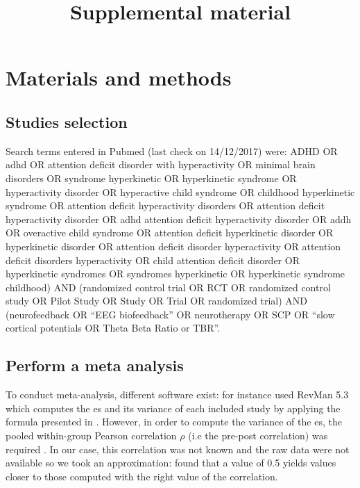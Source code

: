 \documentclass[12pt,a4paper,english]{article}
\begin{document}
\title{Supplemental material}
\date{}
\maketitle

\section{Materials and methods}

\subsection{Studies selection}
Search terms entered in Pubmed (last check on 14/12/2017) were: 
\guillemotleft ADHD OR adhd OR attention deficit disorder with hyperactivity OR minimal brain disorders OR syndrome hyperkinetic OR hyperkinetic
syndrome OR hyperactivity disorder OR hyperactive child syndrome OR childhood hyperkinetic syndrome OR attention deficit hyperactivity disorders
OR attention deficit hyperactivity disorder OR adhd attention deficit hyperactivity disorder OR addh OR overactive child syndrome OR attention deficit hyperkinetic 
disorder OR hyperkinetic disorder OR attention deficit disorder hyperactivity OR attention deficit disorders hyperactivity OR child attention deficit disorder 
OR hyperkinetic syndromes OR syndromes hyperkinetic OR hyperkinetic syndrome childhood) AND (randomized control trial OR RCT OR randomized control study OR Pilot
Study OR Study OR Trial OR randomized trial) AND (neurofeedback OR “EEG biofeedback” OR neurotherapy OR SCP OR “slow cortical potentials OR Theta Beta Ratio or TBR”\guillemotright.


\subsection{Perform a meta analysis}

To conduct meta-analysis, different software exist: for instance \citet{Cortese2016} used RevMan 5.3 \citep{RevMan} which computes the \gls{es} and its 
variance of each included study by applying the formula presented in \citet{Morris2008}. However, in order to compute the variance of the \gls{es}, 
the pooled within-group Pearson correlation $\rho$ (i.e the pre-post correlation) was required 
\citep{James2013}. In our case, this correlation was not known and the raw data were not available so we took an
 approximation: \citet{Balk2012} found that a value of 0.5 yields values closer to those computed with the right value of the correlation. 
\end{document}

